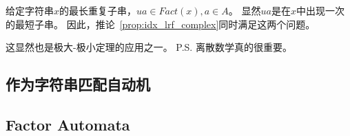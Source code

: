 \documentclass[UTF8]{ctexart}
\theoremstyle{definition}
\theoremstyle{remark}
\numberwithin{equation}{subsection}
\begin{document}
	给定字符串$x$的最长重复子串，$ua \in Fact(x), a \in A$。
	显然$ua$是在$x$中出现一次的最短子串。
	因此，推论~\ref{prop:idx_lrf_complex}同时满足这两个问题。
	
	这显然也是极大-极小定理的应用之一。
	P.S. 离散数学真的很重要。
	
\subsection{作为字符串匹配自动机}
\label{sub:as_strmatch_automata}
	
\subsection{Factor Automata}	
\label{sub:factor_automata}
	
\end{document}
